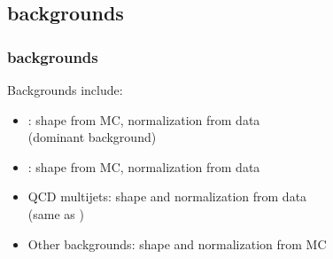 \documentclass[bigger]{beamer}
\begin{document}
\subsection{\enujj backgrounds}
\label{sec-3-2}
\begin{frame}
\frametitle{\enujj backgrounds}
\label{sec-3-2-1}
\begin{block}{Backgrounds include:}
\label{sec-3-2-1-1}
\begin{itemize}

\item \ttbar: shape from MC, normalization from data \\ (dominant background)
\label{sec-3-2-1-1-1}%

\item \wjets: shape from MC, normalization from data
\label{sec-3-2-1-1-2}%

\item QCD multijets: shape and normalization from data \\ (same as \eejj)
\label{sec-3-2-1-1-3}%

\item Other backgrounds: shape and normalization from MC
\label{sec-3-2-1-1-4}%
\end{itemize} %
\end{block}
\end{frame}
\end{document}
